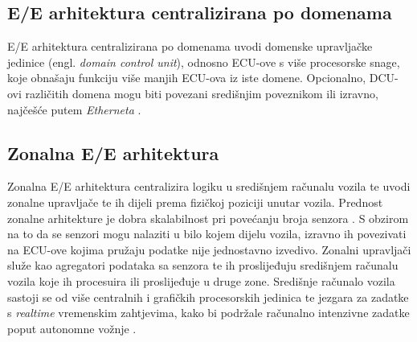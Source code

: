 \documentclass[times, utf8, diplomski, numeric]{fer}
\begin{document}
\subsection{E/E arhitektura centralizirana po domenama}
E/E arhitektura centralizirana po domenama uvodi domenske upravljačke jedinice (engl. \textit{domain control unit}), odnosno ECU-ove s više procesorske snage, koje obnašaju funkciju više manjih ECU-ova iz iste domene. Opcionalno, DCU-ovi različitih domena mogu biti povezani središnjim poveznikom ili izravno, najčešće putem \textit{Etherneta} \cite{bosch2022handbook, nasser2023automotive}.

\subsection{Zonalna E/E arhitektura}
Zonalna E/E arhitektura centralizira logiku u središnjem računalu vozila  te uvodi zonalne upravljače te ih dijeli prema fizičkoj poziciji unutar vozila. Prednost zonalne arhitekture je dobra skalabilnost pri povećanju broja senzora \cite{bosch2022handbook}. S obzirom na to da se senzori mogu nalaziti u bilo kojem dijelu vozila, izravno ih povezivati na ECU-ove kojima pružaju podatke nije jednostavno izvedivo. Zonalni upravljači služe kao agregatori podataka sa senzora te ih proslijeđuju središnjem računalu vozila koje ih procesuira ili proslijeđuje u druge zone. Središnje računalo vozila sastoji se od više centralnih i grafičkih procesorskih jedinica te jezgara za zadatke s \textit{realtime} vremenskim zahtjevima, kako bi podržale računalno intenzivne zadatke poput autonomne vožnje \cite{nasser2023automotive}.
\end{document}
